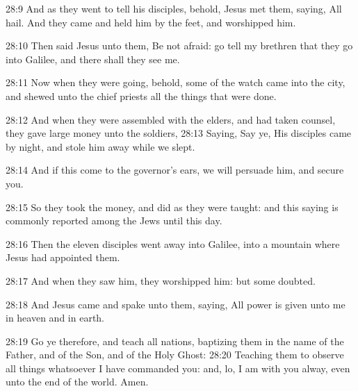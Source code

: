 28:9 And as they went to tell his disciples, behold, Jesus met them, saying, All hail. And they came and held him by the feet, and worshipped him.

28:10 Then said Jesus unto them, Be not afraid: go tell my brethren that they go into Galilee, and there shall they see me.

28:11 Now when they were going, behold, some of the watch came into the city, and shewed unto the chief priests all the things that were done.

28:12 And when they were assembled with the elders, and had taken counsel, they gave large money unto the soldiers, 28:13 Saying, Say ye, His disciples came by night, and stole him away while we slept.

28:14 And if this come to the governor's ears, we will persuade him, and secure you.

28:15 So they took the money, and did as they were taught: and this saying is commonly reported among the Jews until this day.

28:16 Then the eleven disciples went away into Galilee, into a mountain where Jesus had appointed them.

28:17 And when they saw him, they worshipped him: but some doubted.

28:18 And Jesus came and spake unto them, saying, All power is given unto me in heaven and in earth.

28:19 Go ye therefore, and teach all nations, baptizing them in the name of the Father, and of the Son, and of the Holy Ghost: 28:20 Teaching them to observe all things whatsoever I have commanded you: and, lo, I am with you alway, even unto the end of the world. Amen.

